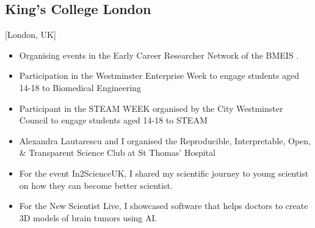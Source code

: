 \documentclass{mycv}
\begin{document}
\subsection{King's College London}[London, UK]
\begin{positions}
\end{positions}
\begin{itemize}
	\item Organising events in the Early Career Researcher Network of the BMEIS .
	\item Participation in the Westminster Enterprise Week to engage students aged 14-18 to Biomedical Engineering 
	\item Participant in the STEAM WEEK organised by the City Westminster Council to engage students aged 14-18 to STEAM \href{https://twitter.com/_mxochicale/status/1374407825607200769}{\faTwitter} 
	\item Alexandra Lautarescu and I organised the Reproducible, Interpretable, Open, \& Transparent Science Club at St Thomas' Hospital 
	\item For the event In2ScienceUK, I shared my scientific journey to young scientist on how they can become better scientist.  
	\item For the New Scientist Live, I showcased software that helps doctors to create 3D models of brain tumors using AI. 
\end{itemize}
\end{document}
